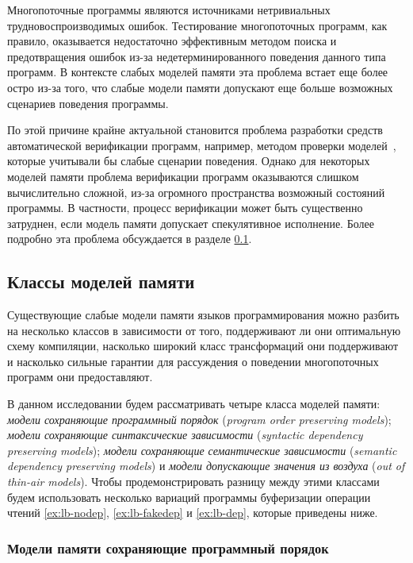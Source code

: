Многопоточные программы являются источниками нетривиальных
трудновоспроизводимых ошибок. 
Тестирование многопоточных программ, как правило, 
оказывается недостаточно эффективным методом поиска 
и предотвращения ошибок из-за недетерминированного 
поведения данного типа программ.
В контексте слабых моделей памяти эта проблема встает еще более остро 
из-за того, что слабые модели памяти допускают еще больше 
возможных сценариев поведения программы. 

По этой причине крайне актуальной становится проблема
разработки средств автоматической верификации программ, 
например, методом проверки моделей~\cite{Baier:2008},
которые учитывали бы слабые сценарии поведения.
Однако для некоторых моделей памяти проблема верификации 
программ оказываются слишком вычислительно сложной, 
из-за огромного пространства возможный состояний программы. 
В частности, процесс верификации может быть существенно затруднен, 
если модель памяти допускает спекулятивное исполнение.
Более подробно эта проблема обсуждается в разделе \ref{sec:models-classes}.  

\subsection{Классы моделей памяти}
\label{sec:models-classes}

Существующие слабые модели памяти языков программирования 
можно разбить на несколько классов в зависимости от того, 
поддерживают ли они оптимальную схему компиляции, 
насколько широкий класс трансформаций они поддерживают 
и насколько сильные гарантии для рассуждения о поведении многопоточных программ
они предоставляют. 

В данном исследовании будем рассматривать четыре класса моделей памяти: 
\emph{модели сохраняющие программный порядок}
(\emph{program order preserving models}); 
\emph{модели сохраняющие синтаксические зависимости} 
(\emph{syntactic dependency preserving models});
\emph{модели сохраняющие семантические зависимости} 
(\emph{semantic dependency preserving models}) и 
\emph{модели допускающие значения из воздуха} 
(\emph{out of thin-air models}).
Чтобы продемонстрировать разницу между этими классами 
будем использовать несколько вариаций программы 
буферизации операции чтений 
\ref{ex:lb-nodep}, \ref{ex:lb-fakedep} и \ref{ex:lb-dep}, 
которые приведены ниже. 



\subsubsection*{Модели памяти сохраняющие программный порядок}

